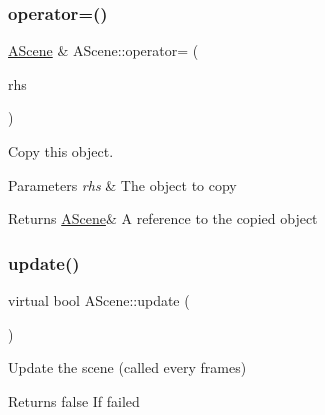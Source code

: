 \mbox{\label{class_a_scene_aedf714310c418b3972e2e9c96ac7bff1}} 
\subsubsection{\texorpdfstring{operator=()}{operator=()}}
{\footnotesize\ttfamily \hyperlink{class_a_scene}{A\+Scene} \& A\+Scene\+::operator= (\begin{DoxyParamCaption}\item[{\hyperlink{class_a_scene}{A\+Scene} const \&}]{rhs }\end{DoxyParamCaption})}



Copy this object. 


\begin{DoxyParams}{Parameters}
{\em rhs} & The object to copy \\
\hline
\end{DoxyParams}
\begin{DoxyReturn}{Returns}
\hyperlink{class_a_scene}{A\+Scene}\& A reference to the copied object 
\end{DoxyReturn}
\mbox{\label{class_a_scene_af3ed61809cc5924b9d5530473576a0c7}} 
\subsubsection{\texorpdfstring{update()}{update()}}
{\footnotesize\ttfamily virtual bool A\+Scene\+::update (\begin{DoxyParamCaption}{ }\end{DoxyParamCaption})\hspace{0.3cm}{\ttfamily [pure virtual]}}



Update the scene (called every frames) 

\begin{DoxyReturn}{Returns}
false If failed 
\end{DoxyReturn}


